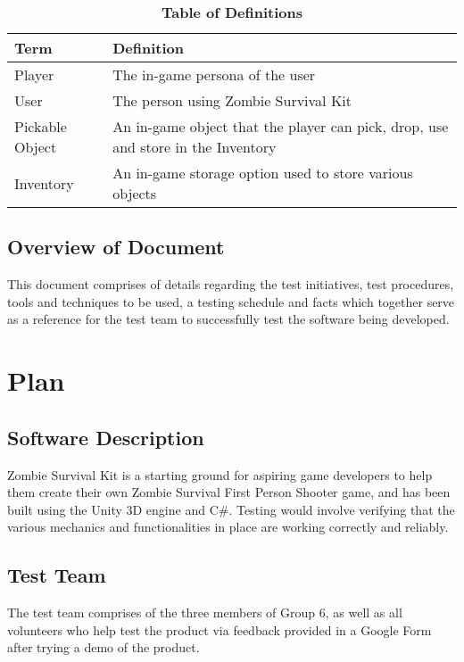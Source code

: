 \documentclass[12pt, titlepage]{article}
\begin{document}
\begin{table}[!htbp]
\caption{\textbf{Table of Definitions}} \label{Table}

\begin{tabularx}{\textwidth}{p{3cm}X}
\toprule
\textbf{Term} & \textbf{Definition}\\
\midrule
Player & The in-game persona of the user\\
User & The person using Zombie Survival Kit\\
Pickable Object & An in-game object that the player can pick, drop, use and store in the Inventory\\
Inventory & An in-game storage option used to store various objects\\
\bottomrule
\end{tabularx}

\end{table}	

\subsection{Overview of Document}

This document comprises of details regarding the test initiatives, test procedures, tools and techniques to be used, a testing schedule and facts which together serve as a reference for the test team to successfully test the software being developed.
\section{Plan}
	
\subsection{Software Description}
Zombie Survival Kit is a starting ground for aspiring game developers to help them create their own Zombie Survival First Person Shooter game, and has been built using the Unity 3D engine and C\#. Testing would involve verifying that the various mechanics and functionalities in place are working correctly and reliably.
 
\subsection{Test Team}
The test team comprises of the three members of Group 6, as well as all volunteers who help test the product via feedback provided in a Google Form after trying a demo of the product.
\end{document}
